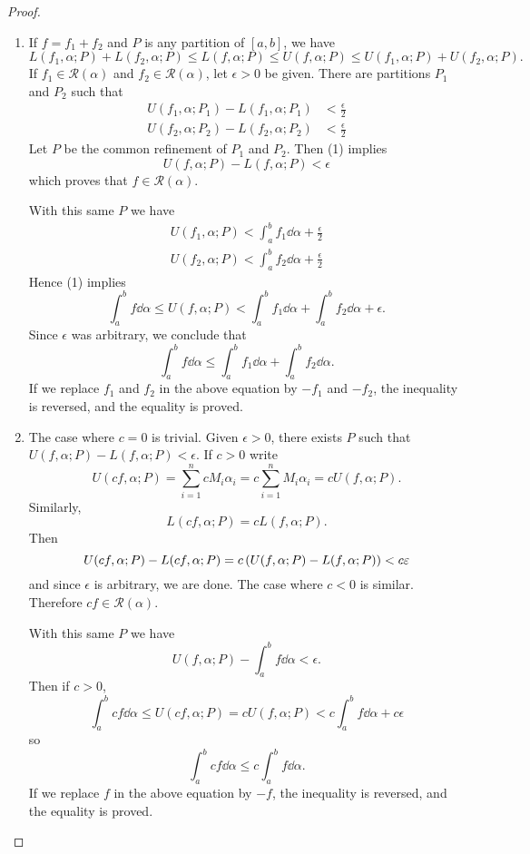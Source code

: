 \begin{proof} \
\begin{enumerate}[label=(\roman*)]
\item If $f=f_1+f_2$ and $P$ is any partition of $[a,b]$, we have
\begin{equation*}\tag{1}
L(f_1,\alpha;P)+L(f_2,\alpha;P)\le L(f,\alpha;P)\le U(f,\alpha;P)\le U(f_1,\alpha;P)+U(f_2,\alpha;P).
\end{equation*}
If $f_1\in \mathcal{R}(\alpha)$ and $f_2\in \mathcal{R}(\alpha)$, let $\epsilon>0$ be given. There are partitions $P_1$ and $P_2$ such that
\begin{align*}
U(f_1,\alpha;P_1)-L(f_1,\alpha;P_1)&<\frac{\epsilon}{2}\\
U(f_2,\alpha;P_2)-L(f_2,\alpha;P_2)&<\frac{\epsilon}{2}
\end{align*}
Let $P$ be the common refinement of $P_1$ and $P_2$. Then (1) implies
\[U(f,\alpha;P)-L(f,\alpha;P)<\epsilon\]
which proves that $f\in\mathcal{R}(\alpha)$.

With this same $P$ we have
\begin{align*}
U(f_1,\alpha;P)<\int_{a}^{b}f_1\dd{\alpha}+\frac{\epsilon}{2}\\
U(f_2,\alpha;P)<\int_{a}^{b}f_2\dd{\alpha}+\frac{\epsilon}{2}
\end{align*}
Hence (1) implies
\[\int_{a}^{b}f\dd{\alpha}\le U(f,\alpha;P)<\int_{a}^{b}f_1\dd{\alpha}+\int_{a}^{b}f_2\dd{\alpha}+\epsilon.\]
Since $\epsilon$ was arbitrary, we conclude that
\[\int_{a}^{b}f\dd{\alpha}\le\int_{a}^{b}f_1\dd{\alpha}+\int_{a}^{b}f_2\dd{\alpha}.\]
If we replace $f_1$ and $f_2$ in the above equation by $-f_1$ and $-f_2$, the inequality is reversed, and the equality is proved.

\item The case where $c=0$ is trivial. Given $\epsilon>0$, there exists $P$ such that $U(f,\alpha;P)-L(f,\alpha;P)<\epsilon$. If $c>0$ write
\[U(cf,\alpha;P)=\sum_{i=1}^{n}cM_i\alpha_i=c\sum_{i=1}^{n}M_i\alpha_i=c U(f,\alpha;P).\]
Similarly,
\[L(cf,\alpha;P)=c L(f,\alpha;P).\]
Then
\[U(cf,\alpha;P)-L(cf,\alpha;P)=c\left(U(f,\alpha;P)-L(f,\alpha;P)\right)<c\varepsilon\]
and since $\epsilon$ is arbitrary, we are done. The case where $c<0$ is similar. Therefore $cf\in\mathcal{R}(\alpha)$.

With this same $P$ we have
\[U(f,\alpha;P)-\int_{a}^{b}f\dd{\alpha}<\epsilon.\]
Then if $c>0$,
\[\int_{a}^{b}cf\dd{\alpha}\le U(cf,\alpha;P)=cU(f,\alpha;P)<c\int_{a}^{b}f\dd{\alpha}+c\epsilon\]
so
\[\int_{a}^{b}cf\dd{\alpha}\le c\int_{a}^{b}f\dd{\alpha}.\]
If we replace $f$ in the above equation by $-f$, the inequality is reversed, and the equality is proved.


\end{enumerate}
\end{proof}
